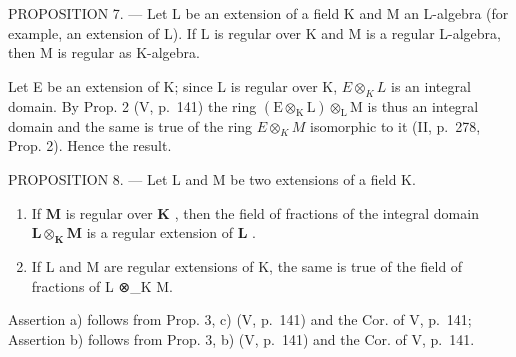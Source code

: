 PROPOSITION 7. --- Let L be an extension of a field K and M an L-algebra (for example, an extension of L). If L is regular over K and M is a regular L-algebra, then M is regular as K-algebra.

Let E be an extension of K; since L is regular over K, \(E \otimes_{K} L\) is an integral domain. By Prop. 2 (V, p.~141) the ring \((\mathrm{E} \otimes_{\mathrm{K}} \mathrm{L}) \otimes_{\mathrm{L}} \mathrm{M}\) is thus an integral domain and the same is true of the ring \(E \otimes_{K} M\) isomorphic to it (II, p.~278, Prop. 2). Hence the result.

PROPOSITION 8. --- Let L and M be two extensions of a field K.

\begin{enumerate}
\def\labelenumi{\alph{enumi})}
\item
  If \(\mathbf{M}\) is regular over \(\mathbf{K}\) , then the field of fractions of the integral domain \(\mathbf{L} \otimes_{\mathbf{K}} \mathbf{M}\) is a regular extension of \(\mathbf{L}\) .
\item
  If L and M are regular extensions of K, the same is true of the field of fractions of L ⊗\_K M.
\end{enumerate}

Assertion a) follows from Prop. 3, c) (V, p.~141) and the Cor. of V, p.~141; Assertion b) follows from Prop. 3, b) (V, p.~141) and the Cor. of V, p.~141.

